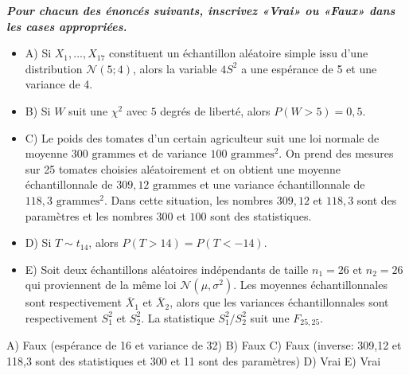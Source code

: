 \begin{questions}
\newpage

\question[5]\label{statPonctuelles}

\textbf{\textit{Pour chacun des énoncés suivants, inscrivez «Vrai» ou «Faux» dans les cases appropriées.}}

\begin{itemize}[label = { }]
    \item A) Si $X_1,...,X_{17}$ constituent un échantillon aléatoire simple issu d'une distribution $\mathcal{N}(5; 4)$, alors la variable $4S^2$ a une espérance de 5 et une variance de 4.
    
    \vfrep{}
    
    \item B) Si $W$ suit une $\chi^2$ avec $5$ degrés de liberté, alors $P(W>5)=0,5$. 
    
    \vfrep{}
    
    \item C) Le poids des tomates d'un certain agriculteur suit une loi normale de moyenne $300\text{ grammes}$ et de variance $100\text{ grammes}^2$. On prend des mesures sur 25 tomates choisies aléatoirement et on obtient une moyenne échantillonnale de $309,12\text{ grammes}$ et une variance échantillonnale de $118,3\text{ grammes}^2$. Dans cette situation, les nombres $309,12$ et $118,3$ sont des paramètres et les nombres $300$ et $100$ sont des statistiques. 
    
    \vfrep{}
    
    \item D) Si $T\sim t_{14}$, alors $P(T>14)=P(T<-14)$.
    
    \vfrep{}
    
    \item E) Soit deux échantillons aléatoires indépendants de taille $n_1=26$ et $n_2=26$ qui proviennent de la même loi $\mathcal{N}(\mu, \sigma^2)$. Les moyennes échantillonnales sont respectivement $\overline{X}_1$ et $\overline{X}_2$, alors que les variances échantillonnales sont respectivement $S^2_1$ et $S^2_2$. La statistique $S^2_1/S^2_2$ suit une $F_{25,25}$. 
    
    \vfrep{}
    
\end{itemize}


\begin{solution}
A) Faux (espérance de 16 et variance de 32)
B) Faux
C) Faux (inverse: 309,12 et 118,3 sont des statistiques et 300 et 11 sont des paramètres)
D) Vrai
E) Vrai
\end{solution}



\end{questions}
